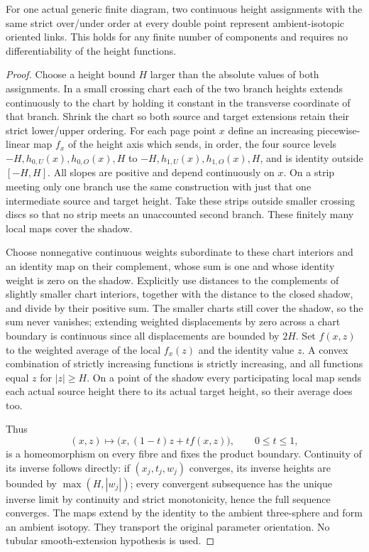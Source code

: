 \begin{lemma}
\label{lem:gauss-height-isotopy}
For one actual generic finite diagram, two continuous height assignments
with the same strict over/under order at every double point represent
ambient-isotopic oriented links. This holds for any finite number of
components and requires no differentiability of the height functions.
\end{lemma}
\begin{proof}
Choose a height bound $H$ larger than the absolute values of both
assignments. In a small crossing chart each of the two branch heights
extends continuously to the chart by holding it constant in the transverse
coordinate of that branch. Shrink the chart so both source and target
extensions retain their strict lower/upper ordering. For each page point
$x$ define an increasing piecewise-linear map $f_x$ of the height axis
which sends, in order, the four source levels
$-H,h_{0,U}(x),h_{0,O}(x),H$ to
$-H,h_{1,U}(x),h_{1,O}(x),H$, and is identity outside $[-H,H]$.
All slopes are positive and depend continuously on $x$. On a strip
meeting only one branch use the same construction with just that one
intermediate source and target height. Take these strips outside smaller
crossing discs so that no strip meets an unaccounted second branch.
These finitely many local maps cover the shadow.

Choose nonnegative continuous weights subordinate to these chart
interiors and an identity map on their complement, whose sum is one
and whose identity weight is zero on the shadow. Explicitly use
distances to the complements of slightly smaller chart interiors,
together with the distance to the closed shadow, and divide by their
positive sum. The smaller charts still cover the shadow, so the sum
never vanishes; extending weighted displacements by zero across a
chart boundary is continuous since all displacements are bounded by
$2H$. Set $f(x,z)$ to the weighted average of the local $f_x(z)$
and the identity value $z$. A convex combination of strictly increasing
functions is strictly increasing, and all functions equal $z$ for
$|z|\geq H$. On a point of the shadow every participating local
map sends each actual source height there to its actual target height,
so their average does too.

Thus
\begin{equation}\label{eq:gauss-height-map}
 (x,z)\longmapsto
       \bigl(x,(1-t)z+t f(x,z)\bigr),\qquad 0\leq t\leq1,
\end{equation}
is a homeomorphism on every fibre and fixes the product boundary.
Continuity of its inverse follows directly: if $(x_j,t_j,w_j)$
converges, its inverse heights are bounded by $\max(H,|w_j|)$;
every convergent subsequence has the unique inverse limit by continuity
and strict monotonicity, hence the full sequence converges. The maps
extend by the identity to the ambient three-sphere and form an ambient
isotopy. They transport the original parameter orientation. No tubular
smooth-extension hypothesis is used.
\end{proof}

